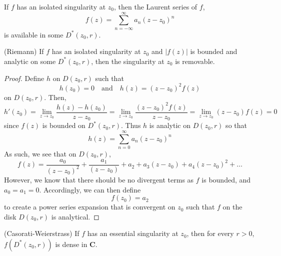 \vspace{2ex}
\begin{cor}
If $f$ has an isolated singularity at $z_0$, then the Laurent series of $f$,
\[f(z)=\sum ^{\infty }_{n=-\infty }a_{n}(z-z_0)^{n}\]
is available in some $D^{*}(z_0,r)$.
\end{cor}
\vspace{2ex}
\begin{thm}
(Riemann) If $f$ has an isolated singularity at $z_0$ and $|f(z)|$ is bounded and analytic on some $D^{*}(z_0,r)$, then the singularity at $z_0$ is removable.
\end{thm}
\vspace{2ex}
\begin{proof}
Define $h$ on $D(z_0,r)$ such that
\[h(z_0)=0\quad \mathrm{and}\quad h(z)=(z-z_0)^2f(z)\]
on $D(z_0,r)$. Then,
\[h'(z_0)=\lim _{z\rightarrow z_0}\dfrac{h(z)-h(z_0)}{z-z_0}=\lim _{z\rightarrow z_0}\dfrac{(z-z_0)^2f(z)}{z-z_0}=\lim _{z\rightarrow z_0}(z-z_0)f(z)=0\]
since $f(z)$ is bounded on $D^{*}(z_0,r)$. Thus $h$ is analytic on $D(z_0,r)$ so that 
\[h(z)=\sum ^{\infty }_{n=0}a_{n}(z-z_0)^{n}\]
As such, we see that on $D(z_0,r)$, 
\[f(z)=\dfrac{a_0}{(z-z_0)^2}+\dfrac{a_1}{(z-z_0)}+a_{2}+a_3(z-z_0)+a_{4}(z-z_0)^2+\ldots \]
However, we know that there should be no divergent terms as $f$ is bounded, and $a_0=a_1=0$. Accordingly, we can then define
\[f(z_0)=a_2\]
to create a power series expansion that is convergent on $z_0$ such that $f$ on the disk $D(z_0,r)$ is analytical.
\end{proof}
\vspace{2ex}
\begin{thm}
(Casorati-Weierstrass) If $f$ has an essential singularity at $z_0$, then for every $r>0$, $f(D^{*}(z_0,r))$ is dense in ${\bm C}$. 
\end{thm}
\vspace{2ex}
